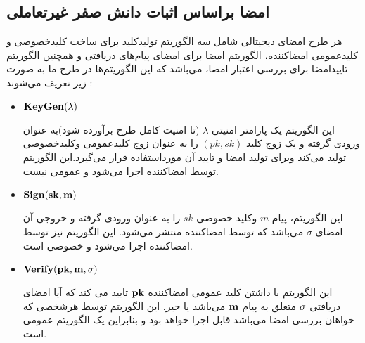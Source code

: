 \subsection{امضا براساس اثبات دانش صفر غیرتعاملی }\label{sign_from_nzkp}

 هر طرح امضای دیجیتالی شامل سه الگوریتم تولیدکلید
برای ساخت کلیدخصوصی و کلیدعمومی امضاکننده، الگوریتم امضا
برای امضای پیام‌های دریافتی و همچنین الگوریتم تایید‌امضا
برای بررسی اعتبار امضا، می‌باشد که این الگوریتم‌ها در طرح ما به صورت زیر تعریف می‌‌شوند :
\begin{itemize}
\item{
$\bf KeyGen(\lambda)$
}
		
این الگوریتم یک پارامتر امنیتی 
$\lambda$
(تا امنیت کامل طرح برآورده شود)به عنوان ورودی گرفته و یک زوج کلید 
$(pk,sk)$
را به عنوان زوج کلیدعمومی وکلیدخصوصی تولید می‌کند وبرای تولید امضا و تایید آن مورداستفاده قرار می‌گیرد.این الگوریتم توسط امضاکننده اجرا می‌شود و عمومی نیست.
\item {
$\bf Sign(sk,m)$	
}

این الگوریتم، پیام
$m$
وکلید خصوصی
$sk$
را به عنوان ورودی گرفته و خروجی آن امضای 
$\sigma$
می‌باشد که توسط امضاکننده منتشر می‌شود. این الگوریتم نیز توسط امضاکننده اجرا می‌شود و خصوصی است.
\item{
$\bf Verify(pk,m,\sigma)$
}

این الگوریتم با داشتن کلید عمومی امضاکننده 
$\bf pk $
تایید می کند که آیا امضای دریافتی 
$\bf \sigma $
متعلق به پیام 
$\bf m $
می‌باشد یا حیر. این الگوریتم توسط هرشخصی که خواهان بررسی امضا می‌باشد قابل اجرا خواهد بود و بنابراین یک الگوریتم عمومی است.
\end{itemize}

